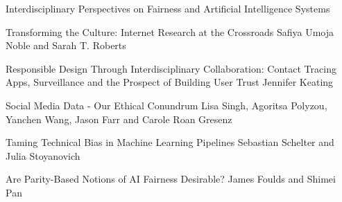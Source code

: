 \documentclass[11pt]{article}
\begin{document}
\begin{bulletin}
\begin{articlesection}{Interdisciplinary Perspectives on Fairness and Artificial Intelligence Systems}
%
%


\begin{article}
{Transforming the Culture: Internet Research at the Crossroads}
{Safiya Umoja Noble and Sarah T. Roberts}
\graphicspath{{submissions/NobleRoberts_final/}}

\end{article}

%
\begin{article}
{Responsible Design Through Interdisciplinary Collaboration: Contact Tracing Apps, Surveillance and the Prospect of Building User Trust}
{Jennifer Keating}
\graphicspath{{submissions/Keating_final/}}

\end{article}
%
%
\begin{article}
{Social Media Data - Our Ethical Conundrum}
{Lisa Singh, Agoritsa Polyzou, Yanchen Wang, Jason Farr and Carole Roan Gresenz}
\graphicspath{{submissions/Singh_final/}}

\end{article}
%
%
\begin{article}
{Taming Technical Bias in Machine Learning Pipelines}
{Sebastian Schelter and Julia Stoyanovich}
\graphicspath{{submissions/SchelterStoyanovich_final/}}

\end{article}
%
%
\begin{article}
{Are Parity-Based Notions of AI Fairness Desirable?}
{James Foulds and Shimei Pan}
\graphicspath{{submissions/foulds_pan_final/}}

\end{article}


\end{articlesection}
\end{bulletin}
\end{document}
